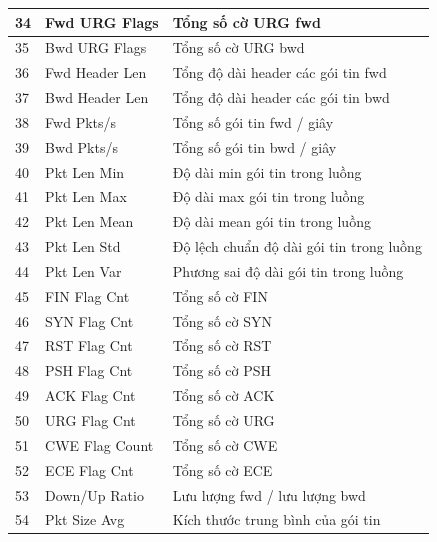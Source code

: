 \begin{center}
\begin{longtable}{|l|l|l|}
		34 & Fwd URG Flags     & Tổng   số cờ URG fwd                               \\ \hline
		35 & Bwd URG Flags     & Tổng   số cờ URG bwd                               \\ \hline
		36 & Fwd Header Len    & Tổng   độ dài header các gói tin fwd               \\ \hline
		37 & Bwd Header Len    & Tổng   độ dài header các gói tin bwd               \\ \hline
		38 & Fwd Pkts/s        & Tổng   số gói tin fwd / giây                       \\ \hline
		39 & Bwd Pkts/s        & Tổng   số gói tin bwd / giây                       \\ \hline
		40 & Pkt Len Min       & Độ   dài min gói tin trong luồng                   \\ \hline
		41 & Pkt Len Max       & Độ   dài max gói tin trong luồng                   \\ \hline
		42 & Pkt Len Mean      & Độ   dài mean gói tin trong luồng                  \\ \hline
		43 & Pkt Len Std       & Độ   lệch chuẩn độ dài gói tin trong luồng         \\ \hline
		44 & Pkt Len Var       & Phương   sai độ dài gói tin trong luồng            \\ \hline
		45 & FIN Flag Cnt      & Tổng   số cờ FIN                                   \\ \hline
		46 & SYN Flag Cnt      & Tổng   số cờ SYN                                   \\ \hline
		47 & RST Flag Cnt      & Tổng   số cờ RST                                   \\ \hline
		48 & PSH Flag Cnt      & Tổng   số cờ PSH                                   \\ \hline
		49 & ACK Flag Cnt      & Tổng   số cờ ACK                                   \\ \hline
		50 & URG Flag Cnt      & Tổng   số cờ URG                                   \\ \hline
		51 & CWE Flag Count    & Tổng   số cờ CWE                                   \\ \hline
		52 & ECE Flag Cnt      & Tổng   số cờ ECE                                   \\ \hline
		53 & Down/Up Ratio     & Lưu   lượng fwd / lưu lượng bwd                    \\ \hline
		54 & Pkt Size Avg      & Kích   thước trung bình của gói tin                \\ \hline

\end{longtable}
\end{center}
